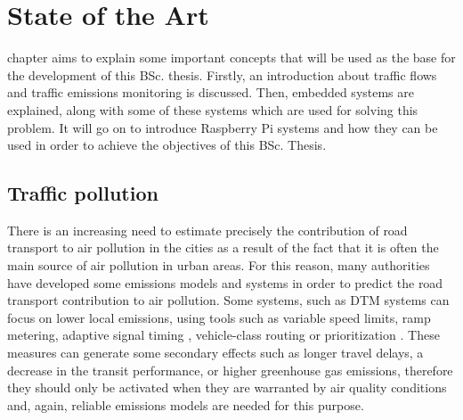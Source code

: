 \chapter{State of the Art}
\label{chap:state_of_the_art}

 chapter aims to explain some important concepts that will be used as the base for the development of this \ac{BSc.} thesis. Firstly, an introduction about traffic flows and traffic emissions monitoring is discussed. Then, embedded systems are explained, along with some of these systems which are used for solving this problem. It will go on to introduce Raspberry Pi systems and how they can be used in order to achieve the objectives of this \ac{BSc.} Thesis.

\section{Traffic pollution}

There is an increasing need to estimate precisely the contribution of road transport to air pollution in the cities as a result of the fact that it is often the main source of air pollution in urban areas. For this reason, many authorities have developed some emissions models and systems in order to predict the road transport contribution to air pollution. Some systems, such as \ac{DTM} systems can focus on lower local emissions, using tools such as variable speed limits, ramp metering, adaptive signal timing \cite{MK10}, vehicle-class routing or prioritization \cite{ZDHB09}. These measures can generate some secondary effects such as longer travel delays, a decrease in the transit performance, or higher greenhouse gas emissions, therefore they should only be activated when they are warranted by air quality conditions \cite{EMA09} and, again, reliable emissions models are needed for this purpose. 

